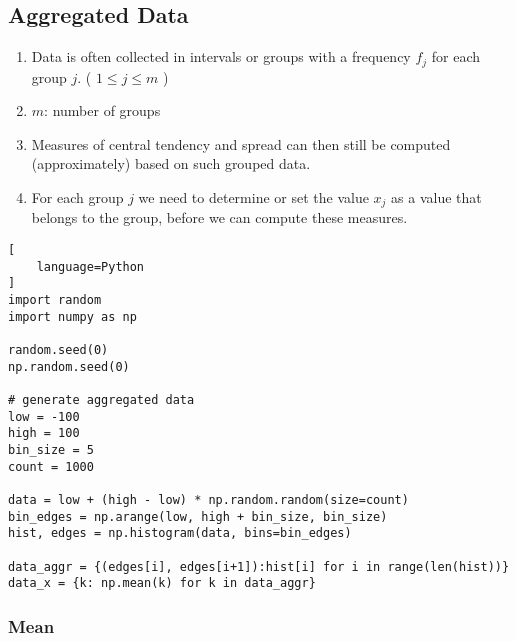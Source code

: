 \subsection{Aggregated Data \cite{statistics/book/Statistics-for-Data-Scientists/Maurits-Kaptein}}\label{Data/Describing Data/Aggregated Data}

\begin{enumerate}
    \item Data is often collected in intervals or groups with a frequency $f_j$ for each group $j$. ( $1 \leq j \leq m$ ) \hfill \cite{statistics/book/Statistics-for-Data-Scientists/Maurits-Kaptein}

    \item $m$: number of groups \hfill \cite{statistics/book/Statistics-for-Data-Scientists/Maurits-Kaptein}

    \item Measures of central tendency and spread can then still be computed (approximately) based on such grouped data. \hfill \cite{statistics/book/Statistics-for-Data-Scientists/Maurits-Kaptein}

    \item For each group $j$ we need to determine or set the value $x_j$ as a value that belongs to the group, before we can compute these measures. \hfill \cite{statistics/book/Statistics-for-Data-Scientists/Maurits-Kaptein}


\end{enumerate}


\begin{lstlisting}[
    language=Python
]
import random
import numpy as np

random.seed(0)
np.random.seed(0)

# generate aggregated data
low = -100
high = 100
bin_size = 5
count = 1000

data = low + (high - low) * np.random.random(size=count)
bin_edges = np.arange(low, high + bin_size, bin_size)
hist, edges = np.histogram(data, bins=bin_edges)

data_aggr = {(edges[i], edges[i+1]):hist[i] for i in range(len(hist))}
data_x = {k: np.mean(k) for k in data_aggr}
\end{lstlisting}

\subsubsection{Mean \cite{statistics/book/Statistics-for-Data-Scientists/Maurits-Kaptein}}\label{Data/Describing Data/Aggregated Data/Mean}


